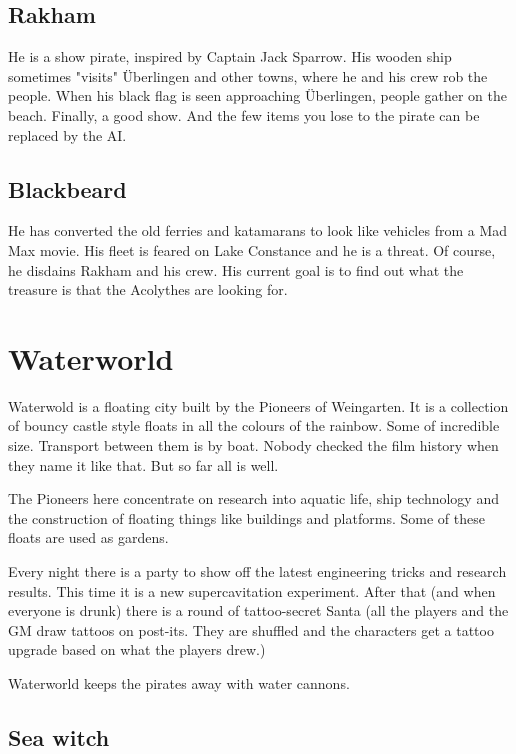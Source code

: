 \subsection{Rakham}

He is a show pirate, inspired by Captain Jack Sparrow. His wooden ship sometimes "visits" Überlingen and other towns, where he and his crew rob the people. When his black flag is seen approaching Überlingen, people gather on the beach. Finally, a good show. And the few items you lose to the pirate can be replaced by the AI.

\subsection{Blackbeard}

He has converted the old ferries and katamarans to look like vehicles from a Mad Max movie. His fleet is feared on Lake Constance and he is a threat. Of course, he disdains Rakham and his crew. His current goal is to find out what the treasure is that the Acolythes are looking for.

\section{Waterworld}

Waterwold is a floating city built by the Pioneers of Weingarten. It is a collection of bouncy castle style floats in all the colours of the rainbow. Some of incredible size. Transport between them is by boat. Nobody checked the film history when they name it like that. But so far all is well.

The Pioneers here concentrate on research into aquatic life, ship technology and the construction of floating things like buildings and platforms. Some of these floats are used as gardens.

Every night there is a party to show off the latest engineering tricks and research results. This time it is a new supercavitation experiment. After that (and when everyone is drunk) there is a round of tattoo-secret Santa (all the players and the GM draw tattoos on post-its. They are shuffled and the characters get a tattoo upgrade based on what the players drew.)

Waterworld keeps the pirates away with water cannons.

\subsection{Sea witch}

